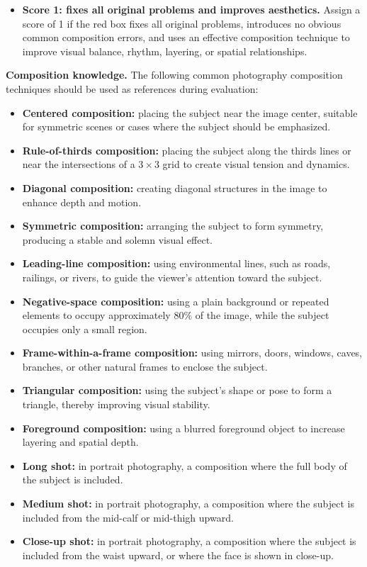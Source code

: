 \documentclass{article} %
\begin{document}
\begin{promptbox}
\begin{itemize}
    \item \textbf{Score 1: fixes all original problems and improves aesthetics.}
    Assign a score of 1 if the red box fixes all original problems, introduces no obvious common composition errors, and uses an effective composition technique to improve visual balance, rhythm, layering, or spatial relationships.
\end{itemize}

\textbf{Composition knowledge.}
The following common photography composition techniques should be used as references during evaluation:
\begin{itemize}
    \item \textbf{Centered composition:} placing the subject near the image center, suitable for symmetric scenes or cases where the subject should be emphasized.
    \item \textbf{Rule-of-thirds composition:} placing the subject along the thirds lines or near the intersections of a $3\times3$ grid to create visual tension and dynamics.
    \item \textbf{Diagonal composition:} creating diagonal structures in the image to enhance depth and motion.
    \item \textbf{Symmetric composition:} arranging the subject to form symmetry, producing a stable and solemn visual effect.
    \item \textbf{Leading-line composition:} using environmental lines, such as roads, railings, or rivers, to guide the viewer's attention toward the subject.
    \item \textbf{Negative-space composition:} using a plain background or repeated elements to occupy approximately 80\% of the image, while the subject occupies only a small region.
    \item \textbf{Frame-within-a-frame composition:} using mirrors, doors, windows, caves, branches, or other natural frames to enclose the subject.
    \item \textbf{Triangular composition:} using the subject's shape or pose to form a triangle, thereby improving visual stability.
    \item \textbf{Foreground composition:} using a blurred foreground object to increase layering and spatial depth.
    \item \textbf{Long shot:} in portrait photography, a composition where the full body of the subject is included.
    \item \textbf{Medium shot:} in portrait photography, a composition where the subject is included from the mid-calf or mid-thigh upward.
    \item \textbf{Close-up shot:} in portrait photography, a composition where the subject is included from the waist upward, or where the face is shown in close-up.
\end{itemize}


\end{promptbox}
\end{document}
